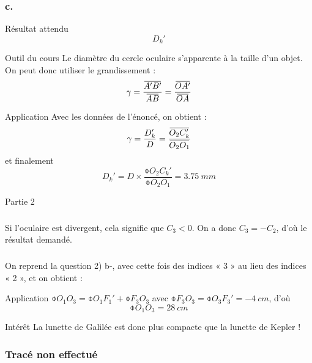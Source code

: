 \documentclass[10pt,a5paper,notitlepage]{book}
\begin{document}
\setcounter{subsubsection}{2}
\subsubsection{c.}
\begin{NCprop}{Résultat attendu}
    $$D_k'$$
\end{NCprop}

\begin{NCdemo}{Outil du cours}
    Le diamètre du cercle oculaire s'apparente à la taille d'un objet. On peut
    donc utiliser le grandissement :
    \[ \g = \frac{\ABp}{\ABb} = \frac{\OAp}{\OA} \]
\end{NCdemo}

\begin{NCexem}{Application}
    Avec les données de l'énoncé, on obtient :
    \[ \g = \frac{D_k'}{D} = \frac{\obar{O_2C_k'}}{\obar{O_2O_1}}\]
    et finalement
    \[ \boxed{D_k' = D\times \frac{\obar{O_2C_k'}}{\obar{O_2O_1}} =
    \SI{3.75}{mm}} \]
\end{NCexem}

\begin{center}
    \huge Partie 2
\end{center}

\subsubsection{}
Si l'oculaire est divergent, cela signifie que $C_3 < 0$. On a donc $C_3 = -
C_2$, d'où le résultat demandé.

\subsubsection{}
On reprend la question 2) b-, avec cette fois des indices « 3 » au lieu des
indices « 2 », et on obtient :

\begin{NCexem}{Application}
    $\obar{O_1O_3} = \obar{O_1F_1'} + \obar{F_3O_3}$ avec $\obar{F_3O_3} =
    \obar{O_3F_3'} = \SI{-4}{cm}$, d'où
    \[ \boxed{\obar{O_1O_3} = \SI{+28}{cm}} \]
\end{NCexem}

\begin{inte}{Intérêt}
    La lunette de Galilée est donc plus compacte que la lunette de Kepler !
\end{inte}

\subsubsection{Tracé non effectué}
\end{document}
